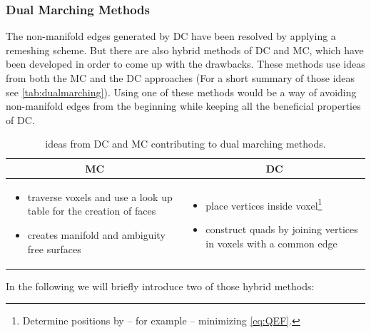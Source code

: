 \subsubsection{Dual Marching Methods}
The non-manifold edges generated by \ac{DC} have been resolved by applying a remeshing scheme. But there are also hybrid methods of \ac{DC} and \ac{MC}, which have been developed in order to come up with the drawbacks. These methods use ideas from both the \ac{MC} and the \ac{DC} approaches (For a short summary of those ideas see \autoref{tab:dualmarching}). Using one of these methods would be a way of avoiding non-manifold edges from the beginning while keeping all the beneficial properties of \ac{DC}.
\begin{table}[H]
\begin{tabularx}{\textwidth}{X|X}
\multicolumn{1}{c|}{\acl{MC}} 
    & \multicolumn{1}{c}{\acl{DC}} 
\\
\hline
\begin{itemize}[ topsep = 0pt, leftmargin=1em]
\item traverse voxels and use a look up table for the creation of faces
\item creates manifold and ambiguity free surfaces
\end{itemize}
&
\begin{itemize}[ topsep = 0pt, leftmargin=1em]
\item place vertices inside voxel\footnote{Determine positions by -- for example -- minimizing \autoref{eq:QEF}.}
\item construct \acp{quad} by joining vertices in voxels with a common edge
\end{itemize}
\end{tabularx}
\caption{ideas from \ac{DC} and \ac{MC} contributing to dual marching methods.}
\label{tab:dualmarching}
\end{table}
In the following we will briefly introduce two of those hybrid methods:

